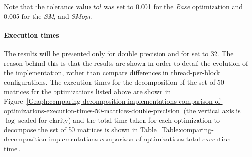 Note that the tolerance value $ tol $ was set to 0.001 for the \textit{Base} optimization and 0.005 for the \textit{SM}, and \textit{SMopt}.

\paragraph{Execution times} The results will be presented only for double precision and for  set to 32. The reason behind this is that the results are shown in order to detail the evolution of the implementation, rather than compare differences in thread-per-block configurations. The execution times for the decomposition of the set of 50 matrices for the optimizations listed above are shown in Figure~\ref{Graph:comparing-decomposition-implementations-comparison-of-optimizations-execution-times-50-matrices-double-precision} (the vertical axis is $ \log $-scaled for clarity) and the total time taken for each optimization to decompose the set of 50 matrices is shown in Table~\ref{Table:comparing-decomposition-implementations-comparison-of-optimizations-total-execution-time}.

